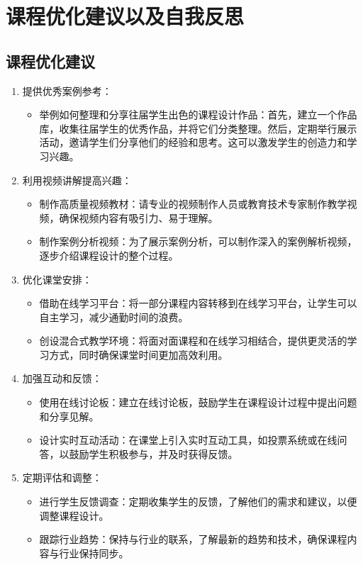 \chapter{课程优化建议以及自我反思}
\section{课程优化建议}
\begin{enumerate}
	\item 提供优秀案例参考：
	\begin{itemize}
		\item 举例如何整理和分享往届学生出色的课程设计作品：首先，建立一个作品库，收集往届学生的优秀作品，并将它们分类整理。然后，定期举行展示活动，邀请学生们分享他们的经验和思考。这可以激发学生的创造力和学习兴趣。
	\end{itemize}
	
	\item 利用视频讲解提高兴趣：
	\begin{itemize}
		\item 制作高质量视频教材：请专业的视频制作人员或教育技术专家制作教学视频，确保视频内容有吸引力、易于理解。
		\item 制作案例分析视频：为了展示案例分析，可以制作深入的案例解析视频，逐步介绍课程设计的整个过程。
	\end{itemize}
	
	\item 优化课堂安排：
	\begin{itemize}
		\item 借助在线学习平台：将一部分课程内容转移到在线学习平台，让学生可以自主学习，减少通勤时间的浪费。
		\item 创设混合式教学环境：将面对面课程和在线学习相结合，提供更灵活的学习方式，同时确保课堂时间更加高效利用。
	\end{itemize}
	
	\item 加强互动和反馈：
	\begin{itemize}
		\item 使用在线讨论板：建立在线讨论板，鼓励学生在课程设计过程中提出问题和分享见解。
		\item 设计实时互动活动：在课堂上引入实时互动工具，如投票系统或在线问答，以鼓励学生积极参与，并及时获得反馈。
	\end{itemize}
	
	\item 定期评估和调整：
	\begin{itemize}
		\item 进行学生反馈调查：定期收集学生的反馈，了解他们的需求和建议，以便调整课程设计。
		\item 跟踪行业趋势：保持与行业的联系，了解最新的趋势和技术，确保课程内容与行业保持同步。
	\end{itemize}

\end{enumerate}

